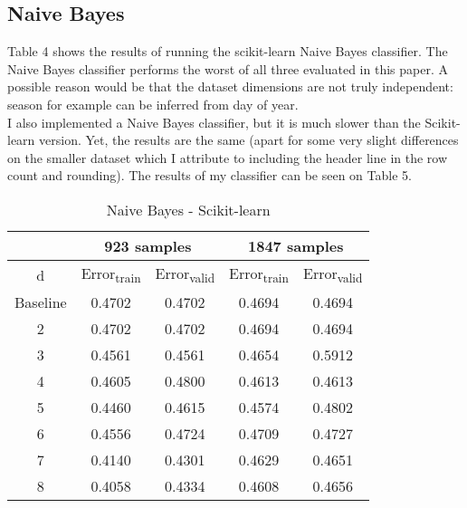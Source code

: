 \documentclass[conference,letterpaper]{IEEEtran}
\begin{document}
\subsection{Naive Bayes}
Table 4 shows the results of running the scikit-learn Naive Bayes classifier. The Naive Bayes classifier performs the worst of all three evaluated in this paper. A possible reason
would be that the dataset dimensions are not truly independent: season for example can be inferred from day of year. \\
I also implemented a Naive Bayes classifier, but it is much slower than the Scikit-learn version. Yet, the results are the same
(apart for some very slight differences on the smaller dataset which I attribute to including the header line in the row count and rounding). The results of my classifier
can be seen on Table 5.
\begin{table}[h]
\renewcommand{\arraystretch}{1.2}
\renewcommand{\thefootnote}{\alph{footnote}}
\caption{Naive Bayes - Scikit-learn} \label{table3}
\begin{minipage} {0.5\textwidth}
\begin{center}
    \begin{tabular}{ | c | c | c | c | c |}
    \hline
\multirow{2}{0.1in}{} 
& \multicolumn{2}{|c|}{923 samples} & \multicolumn{2}{|c|}{1847 samples} \\
\cline{2-4}
    \hline
    d & Error\textsubscript{train} & Error\textsubscript{valid} & Error\textsubscript{train} & Error\textsubscript{valid} \\ \hline
    Baseline & 0.4702 & 0.4702 & 0.4694 & 0.4694 \\ \hline
    2 & 0.4702 & 0.4702 & 0.4694 & 0.4694 \\ \hline
    3 & 0.4561 & 0.4561 & 0.4654 & 0.5912 \\ \hline
    4 & 0.4605 & 0.4800 & 0.4613 & 0.4613 \\ \hline
    5 & 0.4460 & 0.4615 & 0.4574 & 0.4802 \\ \hline
    6 & 0.4556 & 0.4724 & 0.4709 & 0.4727 \\ \hline
    7 & 0.4140 & 0.4301 & 0.4629 & 0.4651 \\ \hline
    8 & 0.4058 & 0.4334 & 0.4608 & 0.4656 \\ \hline
    \end{tabular}
\end{center}
\end{minipage}
\end{table}
\end{document}

